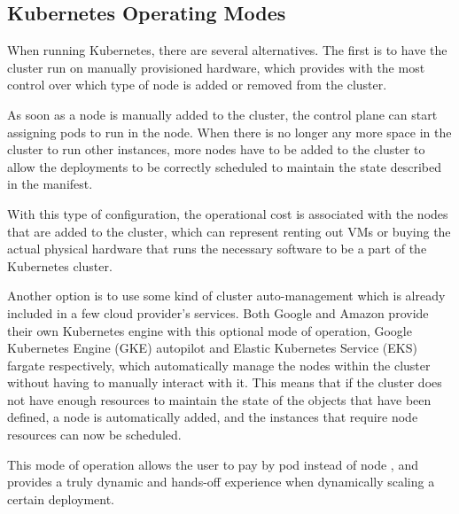 \subsection{Kubernetes Operating Modes}

When running Kubernetes, there are several alternatives. The first is to have
the cluster run on manually provisioned hardware, which provides with the most
control over which type of node is added or removed from the cluster. 

As soon as a node is manually added to the cluster, the control plane can start
assigning pods to run in the node. When there is no longer any more space in the
cluster to run other instances, more nodes have to be added to the cluster to
allow the deployments to be correctly scheduled to maintain the state described
in the manifest.

With this type of configuration, the operational cost is associated with the
nodes that are added to the cluster, which can represent renting out VMs or
buying the actual physical hardware that runs the necessary software to be a
part of the Kubernetes cluster.

Another option is to use some kind of cluster auto-management which is already
included in a few cloud provider's services. Both Google and Amazon provide
their own Kubernetes engine with this optional mode of operation, Google
Kubernetes Engine (GKE) autopilot and Elastic Kubernetes Service (EKS) fargate
respectively, which automatically manage the nodes within the cluster without
having to manually interact with it. This means that if the cluster does not
have enough resources to maintain the state of the objects that have been
defined, a node is automatically added, and the instances that require node
resources can now be scheduled.

This mode of operation allows the user to pay by pod instead of node
\cite{GKEautopilot, EKSfargate}, and provides a truly dynamic and hands-off
experience when dynamically scaling a certain deployment.
